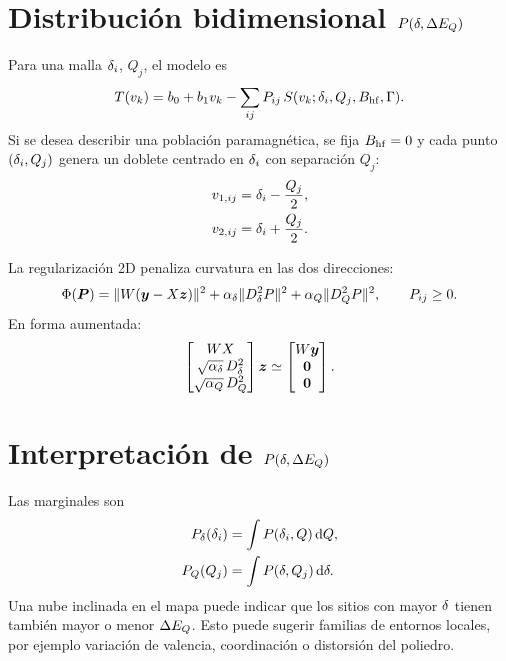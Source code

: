\section{Distribución bidimensional $P(\delta,\Delta E_Q)$}

Para una malla $\delta_i$, $Q_j$, el modelo es
\begin{equation}
  T(v_k)=b_0+b_1v_k-\sum_{ij}P_{ij}\,
  S(v_k;\delta_i,Q_j,B_{\mathrm{hf}},\Gamma).
\end{equation}
Si se desea describir una población paramagnética, se fija $B_{\mathrm{hf}}=0$ y cada punto
$(\delta_i,Q_j)$ genera un doblete centrado en $\delta_i$ con separación $Q_j$:
\begin{align}
  v_{1,ij}&=\delta_i-\frac{Q_j}{2},\\
  v_{2,ij}&=\delta_i+\frac{Q_j}{2}.
\end{align}

La regularización 2D penaliza curvatura en las dos direcciones:
\begin{equation}
  \Phi(\bm P)=\|W(\bm y-X\bm z)\|^2
  +\alpha_{\delta}\|D_{\delta}^2P\|^2
  +\alpha_Q\|D_Q^2P\|^2,
  \qquad P_{ij}\ge0.
\end{equation}
En forma aumentada:
\begin{equation}
  \begin{bmatrix}
    WX\\
    \sqrt{\alpha_{\delta}}\,D_{\delta}^2\\
    \sqrt{\alpha_Q}\,D_Q^2
  \end{bmatrix}\bm z\simeq
  \begin{bmatrix}
    W\bm y\\
    \bm 0\\
    \bm 0
  \end{bmatrix}.
\end{equation}

\section{Interpretación de $P(\delta,\Delta E_Q)$}

Las marginales son
\begin{align}
  P_{\delta}(\delta_i)&=\int P(\delta_i,Q)\,\mathrm{d} Q,\\
  P_Q(Q_j)&=\int P(\delta,Q_j)\,\mathrm{d}\delta.
\end{align}
Una nube inclinada en el mapa puede indicar que los sitios con mayor $\delta$ tienen
también mayor o menor $\Delta E_Q$. Esto puede sugerir familias de entornos locales,
por ejemplo variación de valencia, coordinación o distorsión del poliedro.

